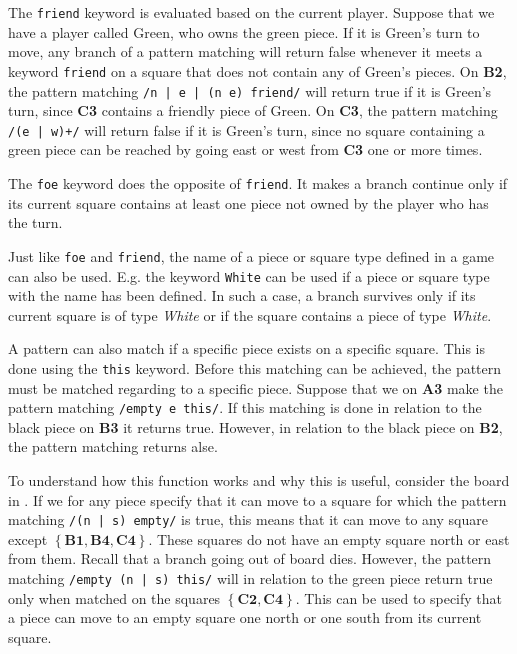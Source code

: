 The \texttt{friend} keyword is evaluated based on the current player. Suppose
that we have a player called Green, who owns the green piece. If it is Green's
turn to move, any branch of a pattern matching will return false whenever it
meets a keyword \texttt{friend} on a square that does not contain any of Green's
pieces. On \textbf{B2}, the pattern matching \texttt{/n | e | (n e) friend/}
will return true if it is Green's turn, since \textbf{C3} contains a friendly
piece of Green. On \textbf{C3}, the pattern matching \texttt{/(e | w)+/} will
return false if it is Green's turn, since no square containing a green piece can
be reached by going east or west from \textbf{C3} one or more times.

The \texttt{foe} keyword does the opposite of \texttt{friend}. It makes a branch
continue only if its current square contains at least one piece not owned by the
player who has the turn.

Just like \texttt{foe} and \texttt{friend}, the name of a piece or square type
defined in a \productname{} game can also be used. E.g. the keyword
\texttt{White} can be used if a piece or square type with the name has been
defined. In such a case, a branch survives only if its current square is of type
\textit{White} or if the square contains a piece of type \textit{White}.

A pattern can also match if a specific piece exists on a specific square. This
is done using the \texttt{this} keyword. Before this matching can be achieved,
the pattern must be matched regarding to a specific piece. Suppose that we on
\textbf{A3} make the pattern matching \texttt{/empty e this/}. If this matching
is done in relation to the black piece on \textbf{B3} it returns true. However,
in relation to the black piece on \textbf{B2}, the pattern matching returns
alse. 

To understand how this function works and why this is useful, consider
the board in . If we for any piece specify that it can
move to a square for which the pattern matching \texttt{/(n | s) empty/} is
true, this means that it can move to any square except $\mathbf{\left\{B1, B4,
C4\right\}}$. These squares do not have an empty square north or east from them.
Recall that a branch going out of board dies.  However, the pattern matching
\texttt{/empty (n | s) this/} will in relation to the green piece return true
only when matched on the squares $\mathbf{\left\{ C2, C4\right\}}$.  This can be
used to specify that a piece can move to an empty square one north or one south
from its current square. 

